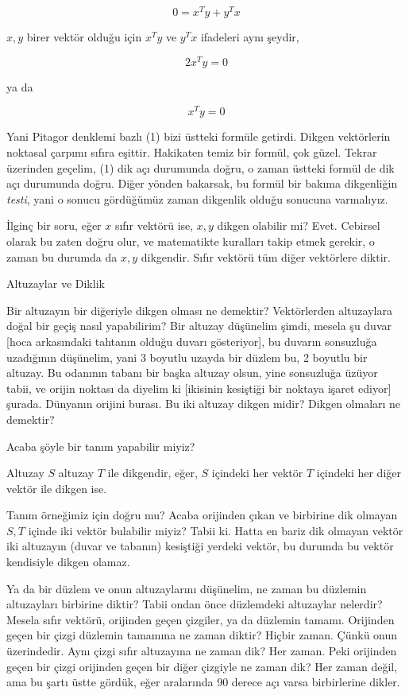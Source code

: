 \documentclass[12pt,fleqn]{article}\usepackage{../../common}
\begin{document}
$$ 
0 = x^Ty + y^Tx 
$$

$x,y$ birer vektör olduğu için $x^Ty$ ve $y^Tx$ ifadeleri aynı şeydir, 

$$ 
2x^Ty = 0
$$

ya da

$$ 
x^Ty = 0
$$

Yani Pitagor denklemi bazlı (1) bizi üstteki formüle getirdi. Dikgen vektörlerin
noktasal çarpımı sıfıra eşittir. Hakikaten temiz bir formül, çok güzel. Tekrar
üzerinden geçelim, (1) dik açı durumunda doğru, o zaman üstteki formül de dik
açı durumunda doğru. Diğer yönden bakarsak, bu formül bir bakıma dikgenliğin
{\em testi}, yani o sonucu gördüğümüz zaman dikgenlik olduğu sonucuna
varmalıyız.

İlginç bir soru, eğer $x$ sıfır vektörü ise, $x,y$ dikgen olabilir mi?
Evet. Cebirsel olarak bu zaten doğru olur, ve matematikte kuralları takip etmek
gerekir, o zaman bu durumda da $x,y$ dikgendir. Sıfır vektörü tüm diğer
vektörlere diktir.

Altuzaylar ve Diklik

Bir altuzayın bir diğeriyle dikgen olması ne demektir? Vektörlerden altuzaylara
doğal bir geçiş nasıl yapabilirim? Bir altuzay düşünelim şimdi, mesela şu duvar
[hoca arkasındaki tahtanın olduğu duvarı gösteriyor], bu duvarın sonsuzluğa
uzadığının düşünelim, yani 3 boyutlu uzayda bir düzlem bu, 2 boyutlu bir
altuzay. Bu odanının tabanı bir başka altuzay olsun, yine sonsuzluğa üzüyor
tabii, ve orijin noktası da diyelim ki [ikisinin kesiştiği bir noktaya işaret
  ediyor] şurada. Dünyanın orijini burası. Bu iki altuzay dikgen midir? Dikgen
olmaları ne demektir?

Acaba şöyle bir tanım yapabilir miyiz?

Altuzay $S$ altuzay $T$ ile dikgendir, eğer, $S$ içindeki her vektör $T$
içindeki her diğer vektör ile dikgen ise.

Tanım örneğimiz için doğru mu? Acaba orijinden çıkan ve birbirine dik olmayan
$S,T$ içinde iki vektör bulabilir miyiz? Tabii ki. Hatta en bariz dik olmayan
vektör iki altuzayın (duvar ve tabanın) kesiştiği yerdeki vektör, bu durumda bu
vektör kendisiyle dikgen olamaz.

Ya da bir düzlem ve onun altuzaylarını düşünelim, ne zaman bu düzlemin
altuzayları birbirine diktir? Tabii ondan önce düzlemdeki altuzaylar nelerdir?
Mesela sıfır vektörü, orijinden geçen çizgiler, ya da düzlemin tamamı. Orijinden
geçen bir çizgi düzlemin tamamına ne zaman diktir? Hiçbir zaman. Çünkü onun
üzerindedir. Aynı çizgi sıfır altuzayına ne zaman dik?  Her zaman. Peki
orijinden geçen bir çizgi orijinden geçen bir diğer çizgiyle ne zaman dik? Her
zaman değil, ama bu şartı üstte gördük, eğer aralarında 90 derece açı varsa
birbirlerine dikler.
\end{document}
